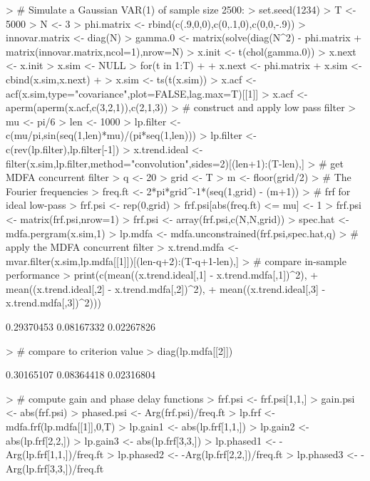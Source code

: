 \documentclass[a4paper]{book}
\begin{document}
\begin{Schunk}
\begin{Sinput}
> # Simulate a Gaussian VAR(1) of sample size 2500:
> set.seed(1234)
> T <- 5000
> N <- 3
> phi.matrix <- rbind(c(.9,0,0),c(0,.1,0),c(0,0,-.9))
> innovar.matrix <- diag(N)
> gamma.0 <- matrix(solve(diag(N^2) - phi.matrix %
+ 	matrix(innovar.matrix,ncol=1),nrow=N)
> x.init <- t(chol(gamma.0)) %
> x.next <- x.init
> x.sim <- NULL
> for(t in 1:T)
+ {
+ 	x.next <- phi.matrix %
+ 	x.sim <- cbind(x.sim,x.next)
+ }
> x.sim <- ts(t(x.sim))
> x.acf <- acf(x.sim,type="covariance",plot=FALSE,lag.max=T)[[1]]
> x.acf <- aperm(aperm(x.acf,c(3,2,1)),c(2,1,3))
> # construct and apply low pass filter
> mu <- pi/6
> len <- 1000
> lp.filter <- c(mu/pi,sin(seq(1,len)*mu)/(pi*seq(1,len)))
> lp.filter <- c(rev(lp.filter),lp.filter[-1])
> x.trend.ideal <- filter(x.sim,lp.filter,method="convolution",sides=2)[(len+1):(T-len),]
> # get MDFA concurrent filter
> q <- 20
> grid <- T
> m <- floor(grid/2)
> # The Fourier frequencies
> freq.ft <- 2*pi*grid^{-1}*(seq(1,grid) - (m+1))
> # frf for ideal low-pass
> frf.psi <- rep(0,grid)
> frf.psi[abs(freq.ft) <= mu] <- 1
> frf.psi <- matrix(frf.psi,nrow=1) %
> frf.psi <- array(frf.psi,c(N,N,grid))
> spec.hat <- mdfa.pergram(x.sim,1)	
> lp.mdfa <- mdfa.unconstrained(frf.psi,spec.hat,q)
> # apply the MDFA concurrent filter
> x.trend.mdfa <- mvar.filter(x.sim,lp.mdfa[[1]])[(len-q+2):(T-q+1-len),]
> # compare in-sample performance
> print(c(mean((x.trend.ideal[,1] - x.trend.mdfa[,1])^2),
+ 	mean((x.trend.ideal[,2] - x.trend.mdfa[,2])^2),
+ 	mean((x.trend.ideal[,3] - x.trend.mdfa[,3])^2)))
\end{Sinput}
\begin{Soutput}
[1] 0.29370453 0.08167332 0.02267826
\end{Soutput}
\begin{Sinput}
> # compare to criterion value
> diag(lp.mdfa[[2]])
\end{Sinput}
\begin{Soutput}
[1] 0.30165107 0.08364418 0.02316804
\end{Soutput}
\begin{Sinput}
> # compute gain and phase delay functions
> frf.psi <- frf.psi[1,1,]
> gain.psi <- abs(frf.psi)
> phased.psi <- Arg(frf.psi)/freq.ft
> lp.frf <- mdfa.frf(lp.mdfa[[1]],0,T)
> lp.gain1 <- abs(lp.frf[1,1,])
> lp.gain2 <- abs(lp.frf[2,2,])
> lp.gain3 <- abs(lp.frf[3,3,])
> lp.phased1 <- -Arg(lp.frf[1,1,])/freq.ft
> lp.phased2 <- -Arg(lp.frf[2,2,])/freq.ft
> lp.phased3 <- -Arg(lp.frf[3,3,])/freq.ft
\end{Sinput}
\end{Schunk}
\end{document}
